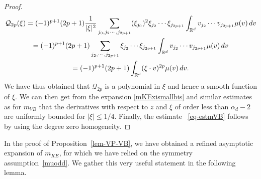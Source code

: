 \documentclass[11pt]{amsart}
\numberwithin{equation}{section}
\begin{document}
\begin{proof}
\begin{multline*}
\mathcal{Q}_{2p}(\xi) =  
   (-1)^{p+1} (2p+1) { 1 \over | \xi|^2} \sum_{j_{0}, j_{2}\cdots, j_{2p+1}} (\xi_{j_{0}})^2 \xi_{j_{2}} \cdots \xi_{j_{2p+1}} \int_{\mathbb{R}^d}
 v_{j_{2}}\cdots v_{j_{2p+1}} \mu(v) \, dv \\
 = (-1)^{p+1} (2p+1)\sum_{ j_{2}, \cdots,  j_{2p+1}}\xi_{j_{2}} \cdots \xi_{j_{2p+1}} \int_{\mathbb{R}^d}
 v_{j_{2}}\cdots v_{j_{2p+1}} \mu(v) \, dv 
 \\=  (-1)^{p+1} (2p+1)  \int_{\mathbb{R}^d}( \xi \cdot v)^{2p} \mu(v)\, dv.
 \end{multline*}
 We have thus obtained that $\mathcal{Q}_{2p}$ is a polynomial in $\xi$ and hence a smooth function of $\xi$.  
 We can then get from   the expansion \eqref{mKExismallbis}
  and similar estimates as for $m_{VB}$  that the derivatives with respect to  $z$ and $\xi$ of order less than $\alpha_d - 2$
  are uniformly bounded for $| \xi| \leq 1/4$. Finally, the estimate ~\eqref{eq-estmVB} follows by using the degree zero homogeneity.
    \end{proof} 
    
    
    In the proof of Proposition~\ref{lem-VP-VB}, we have obtained a refined asymptotic expansion of $m_{KE}$, for which we have relied on the symmetry assumption~\eqref{muodd}. We gather this very useful statement in the following lemma.
    
\end{document}
